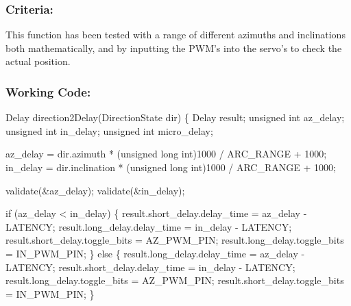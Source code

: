 \documentclass[]{article}
\begin{document}
\subsubsection{Criteria:}
This function has been tested with a range of different azimuths and inclinations both mathematically, and by inputting the PWM's into the servo's to check the actual position.

\subsubsection{Working Code:}
Delay direction2Delay(DirectionState dir) \newline
\{\newline
	Delay result;\newline
	unsigned int az\_delay;\newline
	unsigned int in\_delay;\newline
	unsigned int micro\_delay;\newline
	
	az\_delay = dir.azimuth * (unsigned long int)1000 / ARC\_RANGE + 1000;\newline
	in\_delay = dir.inclination * (unsigned long int)1000 / ARC\_RANGE + 1000;\newline
	
	validate(\&az\_delay);\newline
	validate(\&in\_delay);\newline
	
	if (az\_delay < in\_delay)\newline
	\{\newline
		result.short\_delay.delay\_time = az\_delay - LATENCY;\newline
		result.long\_delay.delay\_time = in\_delay - LATENCY;\newline
		result.short\_delay.toggle\_bits = AZ\_PWM\_PIN;\newline
		result.long\_delay.toggle\_bits = IN\_PWM\_PIN;\newline
	\}\newline
	else\newline
	\{\newline
		result.long\_delay.delay\_time = az\_delay - LATENCY;\newline
		result.short\_delay.delay\_time = in\_delay - LATENCY;\newline
		result.long\_delay.toggle\_bits = AZ\_PWM\_PIN;\newline
		result.short\_delay.toggle\_bits = IN\_PWM\_PIN;\newline
	\}\newline
	
\end{document}
